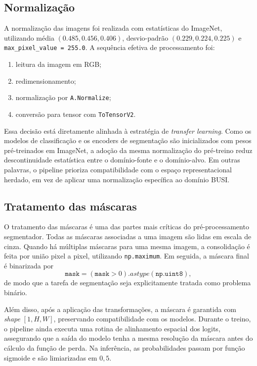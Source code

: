 \documentclass[tcc,capa]{texufpel}
\begin{document}
\subsection{Normalização}

A normalização das imagens foi realizada com estatísticas do ImageNet, utilizando média \((0.485, 0.456, 0.406)\), desvio-padrão \((0.229, 0.224, 0.225)\) e \texttt{max\_pixel\_value = 255.0}. A sequência efetiva de processamento foi:
\begin{enumerate}
	\item leitura da imagem em RGB;
	\item redimensionamento;
	\item normalização por \texttt{A.Normalize};
	\item conversão para tensor com \texttt{ToTensorV2}.
\end{enumerate}

Essa decisão está diretamente alinhada à estratégia de \textit{transfer learning}. Como os modelos de classificação e os encoders de segmentação são inicializados com pesos pré-treinados em ImageNet, a adoção da mesma normalização do pré-treino reduz descontinuidade estatística entre o domínio-fonte e o domínio-alvo. Em outras palavras, o pipeline prioriza compatibilidade com o espaço representacional herdado, em vez de aplicar uma normalização específica ao domínio BUSI.

\subsection{Tratamento das máscaras}

O tratamento das máscaras é uma das partes mais críticas do pré-processamento segmentador. Todas as máscaras associadas a uma imagem são lidas em escala de cinza. Quando há múltiplas máscaras para uma mesma imagem, a consolidação é feita por união pixel a pixel, utilizando \texttt{np.maximum}. Em seguida, a máscara final é binarizada por
\begin{equation}
	\texttt{mask} = (\texttt{mask} > 0).astype(\texttt{np.uint8}),
\end{equation}
de modo que a tarefa de segmentação seja explicitamente tratada como problema binário.

Além disso, após a aplicação das transformações, a máscara é garantida com \textit{shape} \([1,H,W]\), preservando compatibilidade com os modelos. Durante o treino, o pipeline ainda executa uma rotina de alinhamento espacial dos logits, assegurando que a saída do modelo tenha a mesma resolução da máscara antes do cálculo da função de perda. Na inferência, as probabilidades passam por função sigmoide e são limiarizadas em \(0{,}5\).
\end{document}
